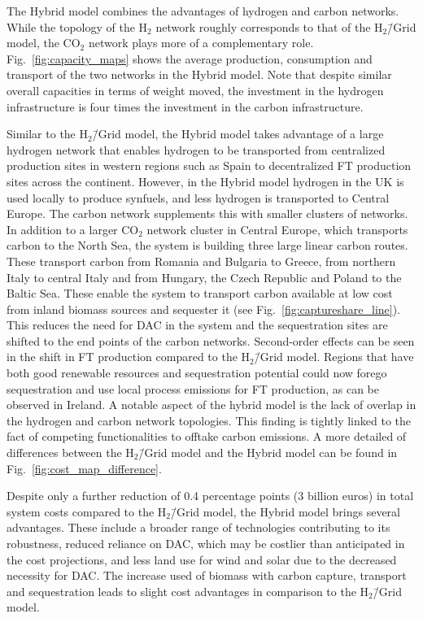 \documentclass[twocolumn]{article}
\newcommand{\COtwo}{CO$_2$}
\newcommand{\Htwo}{H$_2$}
\newcommand{\modH}{H$_2$\=/Grid model}
\newcommand{\modHybrid}{Hybrid model}
\begin{document}
The \modHybrid{} combines the advantages of hydrogen and carbon networks. While the topology of the \Htwo{} network roughly corresponds to that of the \modH{}, the \COtwo{} network plays more of a complementary role. Fig.~\ref{fig:capacity_maps} shows the average production, consumption and transport of the two networks in the \modHybrid{}. Note that despite similar overall capacities in terms of weight moved, the investment in the hydrogen infrastructure is four times the investment in the carbon infrastructure.


Similar to the \modH{}, the \modHybrid{} takes advantage of a large hydrogen network that enables hydrogen to be transported from centralized production sites in western regions such as Spain to decentralized FT production sites across the continent. However, in the \modHybrid{} hydrogen in the UK is used locally to produce synfuels, and less hydrogen is transported to Central Europe.
The carbon network supplements this with smaller clusters of networks. In addition to a larger \COtwo{} network cluster in Central Europe, which transports carbon to the North Sea, the system is building three large linear carbon routes. These transport carbon from Romania and Bulgaria to Greece, from northern Italy to central Italy and from Hungary, the Czech Republic and Poland to the Baltic Sea. These enable the system to transport carbon available at low cost from inland biomass sources and sequester it (see Fig.~\ref{fig:captureshare_line}). This reduces the need for DAC in the system and the sequestration sites are shifted to the end points of the carbon networks. Second-order effects can be seen in the shift in FT production compared to the \modH{}. Regions that have both good renewable resources and sequestration potential could now forego sequestration and use local process emissions for FT production, as can be observed in Ireland. A notable aspect of the hybrid model is the lack of overlap in the hydrogen and carbon network topologies. This finding is tightly linked to the fact of competing functionalities to offtake carbon emissions.
A more detailed of differences between the \modH{} and the \modHybrid{} can be found in Fig.~\ref{fig:cost_map_difference}.


Despite only a further reduction of \label{}0.4 percentage points (\label{}3 billion euros) in total system costs compared to the \modH{}, the \modHybrid{} brings several advantages. These include a broader range of technologies contributing to its robustness, reduced reliance on DAC, which may be costlier than anticipated in the cost projections, and less land use for wind and solar due to the decreased necessity for DAC. The increase used of biomass with carbon capture, transport and sequestration leads to slight cost advantages in comparison to the \modH{}.
\end{document}
